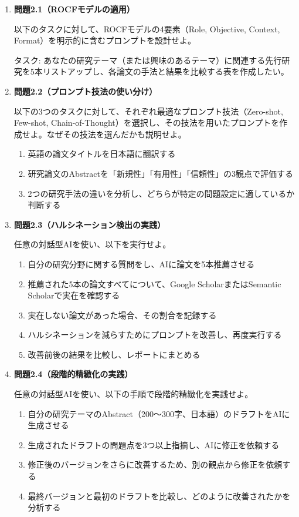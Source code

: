\begin{enumerate}
\item \textbf{問題2.1（ROCFモデルの適用）}

以下のタスクに対して、ROCFモデルの4要素（Role, Objective, Context, Format）を明示的に含むプロンプトを設計せよ。

タスク: あなたの研究テーマ（または興味のあるテーマ）に関連する先行研究を5本リストアップし、各論文の手法と結果を比較する表を作成したい。

\item \textbf{問題2.2（プロンプト技法の使い分け）}

以下の3つのタスクに対して、それぞれ最適なプロンプト技法（Zero-shot, Few-shot, Chain-of-Thought）を選択し、その技法を用いたプロンプトを作成せよ。なぜその技法を選んだかも説明せよ。

\begin{enumerate}
\item[(a)] 英語の論文タイトルを日本語に翻訳する
\item[(b)] 研究論文のAbstractを「新規性」「有用性」「信頼性」の3観点で評価する
\item[(c)] 2つの研究手法の違いを分析し、どちらが特定の問題設定に適しているか判断する
\end{enumerate}

\item \textbf{問題2.3（ハルシネーション検出の実践）}

任意の対話型AIを使い、以下を実行せよ。

\begin{enumerate}
\item 自分の研究分野に関する質問をし、AIに論文を5本推薦させる
\item 推薦された5本の論文すべてについて、Google ScholarまたはSemantic Scholarで実在を確認する
\item 実在しない論文があった場合、その割合を記録する
\item ハルシネーションを減らすためにプロンプトを改善し、再度実行する
\item 改善前後の結果を比較し、レポートにまとめる
\end{enumerate}

\item \textbf{問題2.4（段階的精緻化の実践）}

任意の対話型AIを使い、以下の手順で段階的精緻化を実践せよ。

\begin{enumerate}
\item 自分の研究テーマのAbstract（200〜300字、日本語）のドラフトをAIに生成させる
\item 生成されたドラフトの問題点を3つ以上指摘し、AIに修正を依頼する
\item 修正後のバージョンをさらに改善するため、別の観点から修正を依頼する
\item 最終バージョンと最初のドラフトを比較し、どのように改善されたかを分析する
\end{enumerate}


\end{enumerate}
